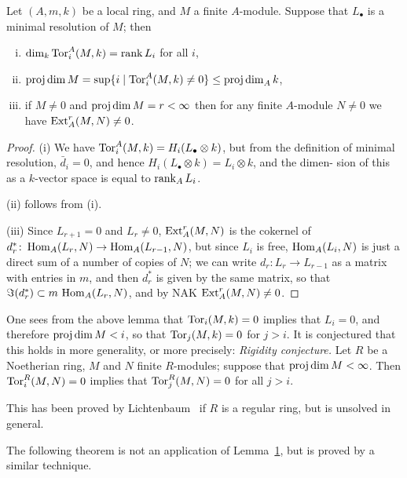 \begin{lemma}\label{lem:19.1}
Let $(A, m, k)$ be a local ring, and $M$ a finite $A$-module. Suppose
that $L_\bullet$ is a minimal resolution of $M$; then
\begin{enumerate}[(i)]
  \item $\dim_k \operatorname{Tor}^A_i(M, k) = \operatorname{rank} L_i$ for all $i$,
  \item $\operatorname{proj\,dim} M = \sup \{i \mid \operatorname{Tor}^A_i(M, k) \neq 0\} \le \operatorname{proj\,dim}_A k$,
  \item if $M \neq 0$ and $\operatorname{proj\,dim} M = r < \infty$ then for any finite $A$-module $N \neq 0$
        we have $\operatorname{Ext}^r_A(M, N) \neq 0$.
\end{enumerate}
\end{lemma}

\begin{proof}
(i) We have $\operatorname{Tor}^A_i(M, k) = H_i(L_\bullet \otimes k)$, but from the definition of
minimal resolution, $\bar{d}_i = 0$, and hence $H_i(L_\bullet \otimes k) = L_i \otimes k$, and the dimen-
sion of this as a $k$-vector space is equal to $\operatorname{rank}_A L_i$.

(ii) follows from (i).

(iii) Since $L_{r+1} = 0$ and $L_r \neq 0$, $\operatorname{Ext}^r_A(M, N)$ is the cokernel of $d_r^*\colon
\operatorname{Hom}_A(L_r, N) \to \operatorname{Hom}_A(L_{r-1}, N)$, but since $L_i$ is free, $\operatorname{Hom}_A(L_i, N)$ is just
a direct sum of a number of copies of $N$; we can write $d_r\colon L_r \to L_{r-1}$ as a
matrix with entries in $m$, and then $d_r^*$ is given by the same matrix, so that
$\Im(d_r^*) \subset m\,\operatorname{Hom}_A(L_r, N)$, and by NAK $\operatorname{Ext}^r_A(M, N) \neq 0$.
\end{proof}

\begin{remark}
One sees from the above lemma that $\operatorname{Tor}_i(M, k) = 0$ implies that
$L_i = 0$, and therefore $\operatorname{proj\,dim} M < i$, so that $\operatorname{Tor}_j(M, k) = 0$ for $j > i$. It is
conjectured that this holds in more generality, or more precisely:
\emph{Rigidity conjecture.} Let $R$ be a Noetherian ring, $M$ and $N$ finite $R$-modules;
suppose that $\operatorname{proj\,dim} M < \infty$. Then $\operatorname{Tor}^R_i(M, N) = 0$ implies that
$\operatorname{Tor}^R_j(M, N) = 0$ for all $j > i$.
\end{remark}

This has been proved by Lichtenbaum~\cite{Li1} if $R$ is a regular ring, but
is unsolved in general.

The following theorem is not an application of Lemma~\hyperref[lem:19.1]{1}, but is proved
by a similar technique.

